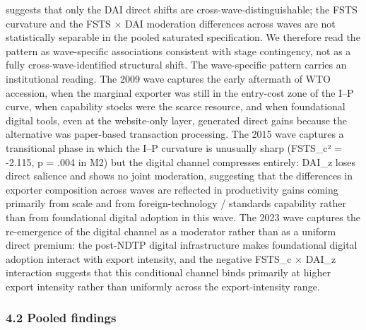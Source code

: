 \documentclass[12pt,a4paper]{article}
\begin{document}
suggests that only the DAI direct shifts are cross-wave-distinguishable;
the FSTS curvature and the FSTS × DAI moderation differences across
waves are not statistically separable in the pooled saturated
specification. We therefore read the pattern as wave-specific
associations consistent with stage contingency, not as a fully
cross-wave-identified structural shift. The wave-specific pattern
carries an institutional reading. The 2009 wave captures the early
aftermath of WTO accession, when the marginal exporter was still in the
entry-cost zone of the I--P curve, when capability stocks were the
scarce resource, and when foundational digital tools, even at the
website-only layer, generated direct gains because the alternative was
paper-based transaction processing. The 2015 wave captures a
transitional phase in which the I--P curvature is unusually sharp
(FSTS\_c² = -2.115, p = .004 in M2) but the digital channel compresses
entirely: DAI\_z loses direct salience and shows no joint moderation,
suggesting that the differences in exporter composition across waves are
reflected in productivity gains coming primarily from scale and from
foreign-technology / standards capability rather than from foundational
digital adoption in this wave. The 2023 wave captures the re-emergence
of the digital channel as a moderator rather than as a uniform direct
premium: the post-NDTP digital infrastructure makes foundational digital
adoption interact with export intensity, and the negative FSTS\_c ×
DAI\_z interaction suggests that this conditional channel binds
primarily at higher export intensity rather than uniformly across the
export-intensity range.

\hypertarget{42-pooled-findings}{%
\subsubsection{4.2 Pooled findings}\label{42-pooled-findings}}
\end{document}
